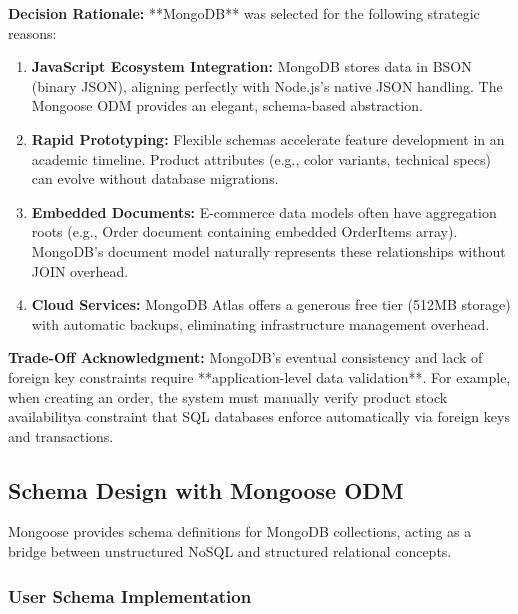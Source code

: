 \documentclass[12pt, a4paper]{report}
\begin{document}
\textbf{Decision Rationale:} **MongoDB** was selected for the following strategic reasons:

\begin{enumerate}
    \item \textbf{JavaScript Ecosystem Integration:} MongoDB stores data in BSON (binary JSON), aligning perfectly with Node.js's native JSON handling. The Mongoose ODM provides an elegant, schema-based abstraction.
    
    \item \textbf{Rapid Prototyping:} Flexible schemas accelerate feature development in an academic timeline. Product attributes (e.g., color variants, technical specs) can evolve without database migrations.
    
    \item \textbf{Embedded Documents:} E-commerce data models often have aggregation roots (e.g., Order document containing embedded OrderItems array). MongoDB's document model naturally represents these relationships without JOIN overhead.
    
    \item \textbf{Cloud Services:} MongoDB Atlas offers a generous free tier (512MB storage) with automatic backups, eliminating infrastructure management overhead.
\end{enumerate}

\textbf{Trade-Off Acknowledgment:} MongoDB's eventual consistency and lack of foreign key constraints require **application-level data validation**. For example, when creating an order, the system must manually verify product stock availabilitya constraint that SQL databases enforce automatically via foreign keys and transactions.

\subsection{Schema Design with Mongoose ODM}

Mongoose provides schema definitions for MongoDB collections, acting as a bridge between unstructured NoSQL and structured relational concepts.

\subsubsection{User Schema Implementation}
\end{document}
